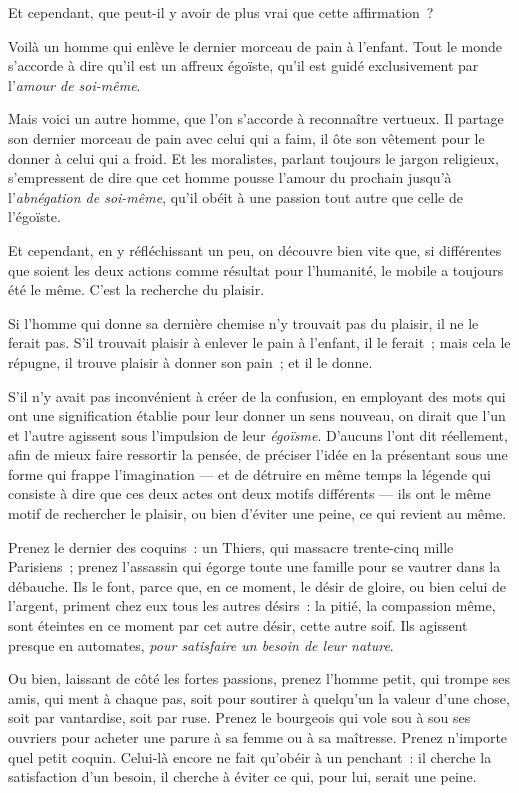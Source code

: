\documentclass[french,twoside]{book} %
\begin{document}
\bigbreak
\noindent Et cependant, que peut-il y avoir de plus vrai que cette affirmation ?\par
Voilà un homme qui enlève le dernier morceau de pain à l’enfant. Tout le monde s’accorde à dire qu’il est un affreux égoïste, qu’il est guidé exclusivement par l’\emph{amour de soi-même}.\par
Mais voici un autre homme, que l’on s’accorde à reconnaître vertueux. Il partage son dernier morceau de pain avec celui qui a faim, il ôte son vêtement pour le donner à celui qui a froid. Et les moralistes, parlant toujours le jargon religieux, s’empressent de dire que cet homme pousse l’amour du prochain jusqu’à l’\emph{abnégation de soi-même}, qu’il obéit à une passion tout autre que celle de l’égoïste.\par
Et cependant, en y réfléchissant un peu, on découvre bien vite que, si différentes que soient les deux actions comme résultat pour l’humanité, le mobile a toujours été le même. C’est la recherche du plaisir.\par
Si l’homme qui donne sa dernière chemise n’y trouvait pas du plaisir, il ne le ferait pas. S’il trouvait plaisir à enlever le pain à l’enfant, il le ferait ; mais cela le répugne, il trouve plaisir à donner son pain ; et il le donne.\par
S’il n’y avait pas inconvénient à créer de la confusion, en employant des mots qui ont une signification établie pour leur donner un sens nouveau, on dirait que l’un et l’autre agissent sous l’impulsion de leur \emph{égoïsme}. D’aucuns l’ont dit réellement, afin de mieux faire ressortir la pensée, de préciser l’idée en la présentant sous une forme qui frappe l’imagination — et de détruire en même temps la légende qui consiste à dire que ces deux actes ont deux motifs différents — ils ont le même motif de rechercher le plaisir, ou bien d’éviter une peine, ce qui revient au même.\par
\bigbreak
\noindent Prenez le dernier des coquins : un Thiers, qui massacre trente-cinq mille Parisiens ; prenez l’assassin qui égorge toute une famille pour se vautrer dans la débauche. Ils le font, parce que, en ce moment, le désir de gloire, ou bien celui de l’argent, priment chez eux tous les autres désirs : la pitié, la compassion même, sont éteintes en ce moment par cet autre désir, cette autre soif. Ils agissent presque en automates, \emph{pour satisfaire un besoin de leur nature}.\par
 Ou bien, laissant de côté les fortes passions, prenez l’homme petit, qui trompe ses amis, qui ment à chaque pas, soit pour soutirer à quelqu’un la valeur d’une chose, soit par vantardise, soit par ruse. Prenez le bourgeois qui vole sou à sou ses ouvriers pour acheter une parure à sa femme ou à sa maîtresse. Prenez n’importe quel petit coquin. Celui-là encore ne fait qu’obéir à un penchant : il cherche la satisfaction d’un besoin, il cherche à éviter ce qui, pour lui, serait une peine.\par
\end{document}
